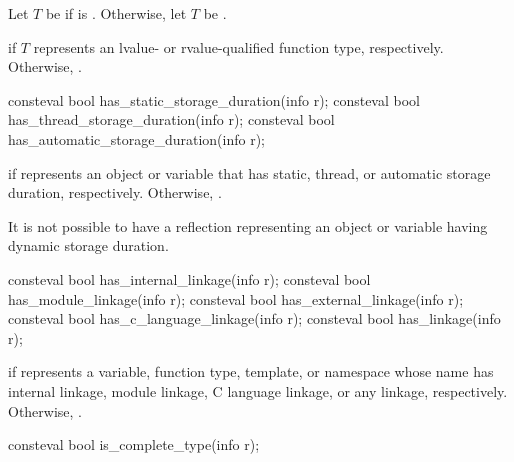 \begin{itemdescr}
\pnum
Let $T$ be  if  is .
Otherwise, let $T$ be .

\pnum
\returns
{} if $T$ represents an
lvalue- or rvalue-qualified function type, respectively.
Otherwise, .
\end{itemdescr}

%
%
%
\begin{itemdecl}
consteval bool has_static_storage_duration(info r);
consteval bool has_thread_storage_duration(info r);
consteval bool has_automatic_storage_duration(info r);
\end{itemdecl}

\begin{itemdescr}
\pnum
\returns
{} if  represents an object or variable that has
static, thread, or automatic storage duration, respectively.
Otherwise, .
\begin{note}
It is not possible to have a reflection
representing an object or variable having dynamic storage duration.
\end{note}
\end{itemdescr}

%
%
%
%
%
\begin{itemdecl}
consteval bool has_internal_linkage(info r);
consteval bool has_module_linkage(info r);
consteval bool has_external_linkage(info r);
consteval bool has_c_language_linkage(info r);
consteval bool has_linkage(info r);
\end{itemdecl}

\begin{itemdescr}
\pnum
\returns
{} if  represents a variable, function type, template, or namespace
whose name has
internal linkage,
module linkage,
C language linkage, or
any linkage, respectively.
Otherwise, .
\end{itemdescr}

%
\begin{itemdecl}
consteval bool is_complete_type(info r);
\end{itemdecl}

